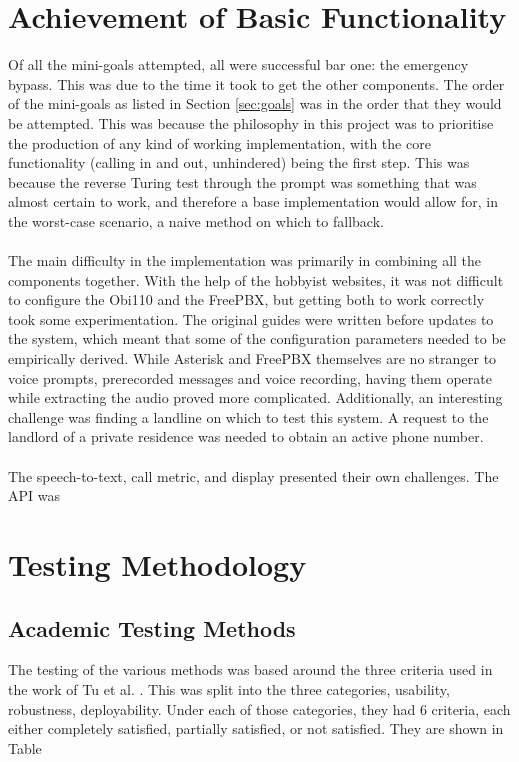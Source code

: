 \documentclass[main.tex]{subfiles}
\begin{document}
\section{Achievement of Basic Functionality}
Of all the mini-goals attempted, all were successful bar one: the emergency bypass. This was due to the time it took to get the other components. The order of the mini-goals as listed in Section \ref{sec:goals} was in the order that they would be attempted. This was because the philosophy in this project was to prioritise the production of any kind of working implementation, with the core functionality (calling in and out, unhindered) being the first step. This was because the reverse Turing test through the prompt was something that was almost certain to work, and therefore a base implementation would allow for, in the worst-case scenario, a naive method on which to fallback.
\\\\
The main difficulty in the implementation was primarily in combining all the components together. With the help of the hobbyist websites, it was not difficult to configure the Obi110 and the FreePBX, but getting both to work correctly took some experimentation. The original guides were written before updates to the system, which meant that some of the configuration parameters needed to be empirically derived. While Asterisk and FreePBX themselves are no stranger to voice prompts, prerecorded messages and voice recording, having them operate while extracting the audio proved more complicated. Additionally, an interesting challenge was finding a landline on which to test this system. A request to the landlord of a private residence was needed to obtain an active phone number.
\\\\
The speech-to-text, call metric, and display presented their own challenges. The API was

\section{Testing Methodology}
\subsection{Academic Testing Methods}
The testing of the various methods was based around the three criteria used in the work of Tu et al. \cite{cisco}. This was split into the three categories, usability, robustness, deployability. Under each of those categories, they had 6 criteria, each either completely satisfied, partially satisfied, or not satisfied. They are shown in Table
\end{document}
